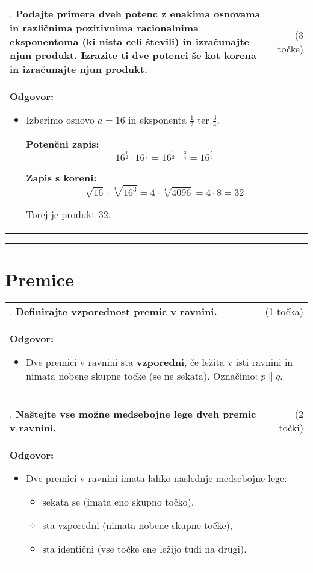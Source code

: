 \documentclass[12pt]{article}
\newcounter{vprasanje}[section]
\renewcommand{\thevprasanje}{\roman{vprasanje}}
\newcommand{\vprasanje}[2]{%
  \stepcounter{vprasanje}%
  \textbf{\thevprasanje}. \textbf{#1} & (#2) \\
}
\newcommand{\odgovor}[1]{%
  \multicolumn{2}{p{\dimexpr\textwidth-2\tabcolsep\relax}}{%
    \small \textbf{Odgovor:} #1%
  } \\[1em]%
}
\newcommand{\crta}{\rule{\textwidth}{0.4pt}}
\newcommand{\naslov}[1]{%
  \vspace{1em} 
  \section{#1}
  \addcontentsline{toc}{section}{\protect\numberline{}#1}%
}
\newcommand{\razmak}[1]{%
  \vspace{#1}
}
\begin{document}
\begin{tabularx}{\textwidth}{X r}
\vprasanje{Podajte primera dveh potenc z enakima osnovama in različnima pozitivnima racionalnima eksponentoma (ki nista celi števili) in izračunajte njun produkt. Izrazite ti dve potenci še kot korena in izračunajte njun produkt.}{3 točke}
\odgovor{%
\begin{itemize}
	\item Izberimo osnovo $a = 16$ in eksponenta $\frac{1}{2}$ ter $\frac{3}{4}$.

	\textbf{Potenčni zapis:}
	\[
	16^{\frac{1}{2}} \cdot 16^{\frac{3}{4}} = 16^{\frac{1}{2} + \frac{3}{4}} = 16^{\frac{5}{4}}
	\]

	\textbf{Zapis s koreni:}
	\[
	\sqrt{16} \cdot \sqrt[4]{16^3} = 4 \cdot \sqrt[4]{4096} = 4 \cdot 8 = 32
	\]

	Torej je produkt $32$.
\end{itemize}
}
\end{tabularx}

\razmak{0.5em}


\crta

\naslov{Premice}

\begin{tabularx}{\textwidth}{X r}
\vprasanje{Definirajte vzporednost premic v ravnini.}{1 točka}
\odgovor{%
\begin{itemize}
	\item Dve premici v ravnini sta \textbf{vzporedni}, če ležita v isti ravnini in nimata nobene skupne točke (se ne sekata). Označimo: $p \parallel q$.
\end{itemize}
}
\end{tabularx}

\begin{tabularx}{\textwidth}{X r}
\vprasanje{Naštejte vse možne medsebojne lege dveh premic v ravnini.}{2 točki}
\odgovor{%
\begin{itemize}
	\item Dve premici v ravnini imata lahko naslednje medsebojne lege:
	\begin{itemize}
 		\item sekata se (imata eno skupno točko),
		\item sta vzporedni (nimata nobene skupne točke),
		\item sta identični (vse točke ene ležijo tudi na drugi).
	\end{itemize}
\end{itemize}
}
\end{tabularx}
\end{document}

